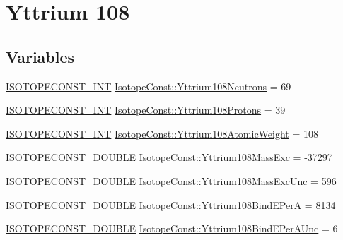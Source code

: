 \hypertarget{group___isotope_const-_yttrium-_y108}{}\section{Yttrium 108}
\label{group___isotope_const-_yttrium-_y108}
\subsection*{Variables}
\begin{DoxyCompactItemize}
\item 
\mbox{\hyperlink{group___isotope_const-_macros_ga5f18360b3e99483a35c32d789e62621c}{I\+S\+O\+T\+O\+P\+E\+C\+O\+N\+S\+T\+\_\+\+I\+NT}} \mbox{\hyperlink{group___isotope_const-_yttrium-_y108_ga247d12a530e623097bc6339e7cd857ba}{Isotope\+Const\+::\+Yttrium108\+Neutrons}} = 69
\item 
\mbox{\hyperlink{group___isotope_const-_macros_ga5f18360b3e99483a35c32d789e62621c}{I\+S\+O\+T\+O\+P\+E\+C\+O\+N\+S\+T\+\_\+\+I\+NT}} \mbox{\hyperlink{group___isotope_const-_yttrium-_y108_ga04a8c2d1a5eb8253fa44bb167034a2e6}{Isotope\+Const\+::\+Yttrium108\+Protons}} = 39
\item 
\mbox{\hyperlink{group___isotope_const-_macros_ga5f18360b3e99483a35c32d789e62621c}{I\+S\+O\+T\+O\+P\+E\+C\+O\+N\+S\+T\+\_\+\+I\+NT}} \mbox{\hyperlink{group___isotope_const-_yttrium-_y108_ga2ca0300f2e3a6ac215b37dd4fb488659}{Isotope\+Const\+::\+Yttrium108\+Atomic\+Weight}} = 108
\item 
\mbox{\hyperlink{group___isotope_const-_macros_ga8f45a7272ce02c0b4c65c44636ed719a}{I\+S\+O\+T\+O\+P\+E\+C\+O\+N\+S\+T\+\_\+\+D\+O\+U\+B\+LE}} \mbox{\hyperlink{group___isotope_const-_yttrium-_y108_gabe9dedcc06ad20597694b9e5f7a6f542}{Isotope\+Const\+::\+Yttrium108\+Mass\+Exc}} = -\/37297
\item 
\mbox{\hyperlink{group___isotope_const-_macros_ga8f45a7272ce02c0b4c65c44636ed719a}{I\+S\+O\+T\+O\+P\+E\+C\+O\+N\+S\+T\+\_\+\+D\+O\+U\+B\+LE}} \mbox{\hyperlink{group___isotope_const-_yttrium-_y108_gab038fe712d55143debfd38ba758ddbd1}{Isotope\+Const\+::\+Yttrium108\+Mass\+Exc\+Unc}} = 596
\item 
\mbox{\hyperlink{group___isotope_const-_macros_ga8f45a7272ce02c0b4c65c44636ed719a}{I\+S\+O\+T\+O\+P\+E\+C\+O\+N\+S\+T\+\_\+\+D\+O\+U\+B\+LE}} \mbox{\hyperlink{group___isotope_const-_yttrium-_y108_gad1b4364edbca1605b86c70d13cc0845a}{Isotope\+Const\+::\+Yttrium108\+Bind\+E\+PerA}} = 8134
\item 
\mbox{\hyperlink{group___isotope_const-_macros_ga8f45a7272ce02c0b4c65c44636ed719a}{I\+S\+O\+T\+O\+P\+E\+C\+O\+N\+S\+T\+\_\+\+D\+O\+U\+B\+LE}} \mbox{\hyperlink{group___isotope_const-_yttrium-_y108_ga86c4255c89a3f047df03548dfeca893c}{Isotope\+Const\+::\+Yttrium108\+Bind\+E\+Per\+A\+Unc}} = 6

\end{DoxyCompactItemize}
